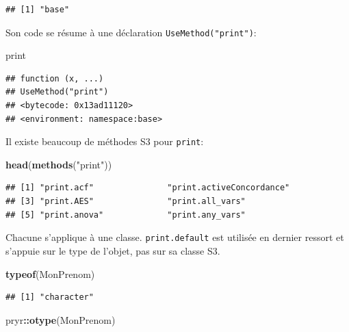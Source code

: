 \documentclass[
  12pt,
  french,
  a4paper,
  extrafontsizes,onecolumn,openright
  ]{memoir}
\newenvironment{Shaded}{\begin{snugshade}}{\end{snugshade}}
\newcommand{\FunctionTok}[1]{\textcolor[rgb]{0.13,0.29,0.53}{\textbf{#1}}}
\newcommand{\NormalTok}[1]{#1}
\newcommand{\SpecialCharTok}[1]{\textcolor[rgb]{0.81,0.36,0.00}{\textbf{#1}}}
\newcommand{\StringTok}[1]{\textcolor[rgb]{0.31,0.60,0.02}{#1}}
\begin{document}
\begin{verbatim}
## [1] "base"
\end{verbatim}

\normalsize

Son code se résume à une déclaration \texttt{UseMethod("print")}:

\scriptsize

\begin{Shaded}
\begin{Highlighting}[]
\NormalTok{print}
\end{Highlighting}
\end{Shaded}

\begin{verbatim}
## function (x, ...) 
## UseMethod("print")
## <bytecode: 0x13ad11120>
## <environment: namespace:base>
\end{verbatim}

\normalsize

Il existe beaucoup de méthodes S3 pour \texttt{print}:

\scriptsize

\begin{Shaded}
\begin{Highlighting}[]
\FunctionTok{head}\NormalTok{(}\FunctionTok{methods}\NormalTok{(}\StringTok{"print"}\NormalTok{))}
\end{Highlighting}
\end{Shaded}

\begin{verbatim}
## [1] "print.acf"               "print.activeConcordance"
## [3] "print.AES"               "print.all_vars"         
## [5] "print.anova"             "print.any_vars"
\end{verbatim}

\normalsize

Chacune s'applique à une classe. \texttt{print.default} est utilisée en dernier ressort et s'appuie sur le type de l'objet, pas sur sa classe S3.

\scriptsize

\begin{Shaded}
\begin{Highlighting}[]
\FunctionTok{typeof}\NormalTok{(MonPrenom)}
\end{Highlighting}
\end{Shaded}

\begin{verbatim}
## [1] "character"
\end{verbatim}

\begin{Shaded}
\begin{Highlighting}[]
\NormalTok{pryr}\SpecialCharTok{::}\FunctionTok{otype}\NormalTok{(MonPrenom)}
\end{Highlighting}
\end{Shaded}
\end{document}
